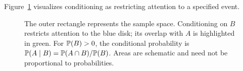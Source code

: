 Figure~\ref{fig:atlas-conditional-events} visualizes conditioning as restricting attention to a specified event.

\begin{figure}[!htbp]
\centering
{}
\caption{The outer rectangle represents the sample space. Conditioning on $B$ restricts attention to the blue disk; its overlap with $A$ is highlighted in green. For $\mathbb{P}(B)>0$, the conditional probability is $\mathbb{P}(A\mid B)=\mathbb{P}(A\cap B)/\mathbb{P}(B)$. Areas are schematic and need not be proportional to probabilities.}
\label{fig:atlas-conditional-events}
\end{figure}